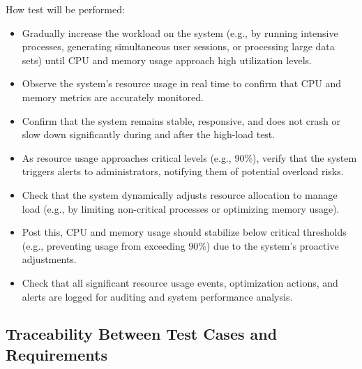 \documentclass[12pt, titlepage]{article}
\begin{document}
\begin{enumerate}
  How test will be performed: 
  \begin{itemize}
    \item Gradually increase the workload on the system (e.g., by running intensive processes,
    generating simultaneous user sessions, or processing large data sets) until CPU and memory
    usage approach high utilization levels.
    \item  Observe the system's resource usage in real time to confirm that CPU and memory
    metrics are accurately monitored.
    \item Confirm that the system remains stable, responsive, and does not crash or slow down
    significantly during and after the high-load test.
    \item As resource usage approaches critical levels (e.g., 90\%), verify that the system
    triggers alerts to administrators, notifying them of potential overload risks.
    \item Check that the system dynamically adjusts resource allocation to manage load (e.g.,
    by limiting non-critical processes or optimizing memory usage).
    \item Post this, CPU and memory usage should stabilize below critical thresholds (e.g.,
    preventing usage from exceeding 90\%) due to the system's proactive adjustments.
    \item Check that all significant resource usage events, optimization actions, and alerts
    are logged for auditing and system performance analysis.
  \end{itemize}

\end{enumerate}

\subsection{Traceability Between Test Cases and Requirements}
\end{document}
